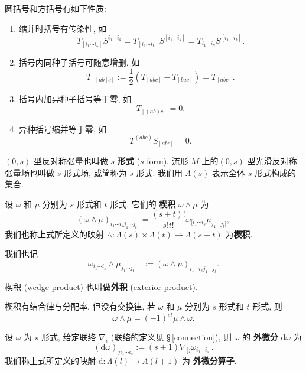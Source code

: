 \begin{theorem}
    圆括号和方括号有如下性质:
    \begin{enumerate}
        \item 缩并时括号有传染性, 如 
        \[ T_{[i_1\cdots i_k]}S^{i_1\cdots i_k} = T_{[i_1\cdots i_k]}S^{[i_1\cdots i_k]}=T_{i_1\cdots i_k}S^{[i_1\cdots i_k]}. \]
        \item 括号内同种子括号可随意增删, 如 
        \[ T_{[[ab]c]}:=\frac{1}{2}(T_{[abc]}-T_{[bac]})=T_{[abc]}. \]
        \item 括号内加异种子括号等于零, 如 
        \[ T_{[(ab)c]}=0. \]
        \item 异种括号缩并等于零, 如 
        \[ T^{(abc)}S_{[abc]}=0. \]
    \end{enumerate}
\end{theorem}

\begin{definition}[微分形式]
    $ (0,s) $ 型反对称张量也叫做 $ s $ {\bf 形式} ($ s $-form). 流形 $ M $ 上的$ (0,s) $ 型光滑反对称张量场也叫做 $ s $ 形式场, 或简称为 $ s $ 形式. 我们用 $ \Lambda(s) $ 表示全体 $ s $ 形式构成的集合.
\end{definition}

\begin{definition}[楔积]
    设 $ \omega $ 和 $ \mu $ 分别为 $ s $ 形式和 $ t $ 形式, 它们的 {\bf 楔积} $\omega\wedge\mu$ 为
    \[ (\omega\wedge\mu)_{i_1\cdots i_sj_1\cdots j_t}:=\frac{(s+t)!}{s!t!}\omega_{[i_1\cdots i_s}\mu_{j_1\cdots j_t]}, \]
    我们也称上式所定义的映射 $ \wedge:\Lambda(s)\times\Lambda(t)\to\Lambda(s+t) $ 为{\bf 楔积}.
\end{definition}
\begin{remark}
	我们也记
	\[ \omega_{i_1\cdots i_s}\wedge\mu_{j_1\cdots j_t=}:=(\omega\wedge\mu)_{i_1\cdots i_sj_1\cdots j_t}. \] 
\end{remark}
\begin{remark}
    楔积 (wedge product) 也叫做{\bf 外积} (exterior product).
\end{remark}

楔积有结合律与分配率, 但没有交换律, 若 $ \omega $ 和 $ \mu $ 分别为 $ s $ 形式和 $ t $ 形式, 则 
\[ \omega\wedge\mu=(-1)^{st}\mu\wedge\omega. \]


\begin{definition}[外微分]
	设 $\omega$ 为 $s$ 形式, 给定联络 $\nabla_i$ (联络的定义见 \S\,\ref{connection}), 则 $\omega$ 的 {\bf 外微分} $\mathrm{d}\omega$ 为
	\[ (\mathrm{d}\omega)_{ji_1\cdots i_s}:=(s+1)\nabla_{[j}\omega_{i_1\cdots i_s]}. \]
	我们称上式所定义的映射 $ \mathrm{d}:\Lambda(l)\to\Lambda(l+1) $ 为 {\bf 外微分算子}.
\end{definition}

